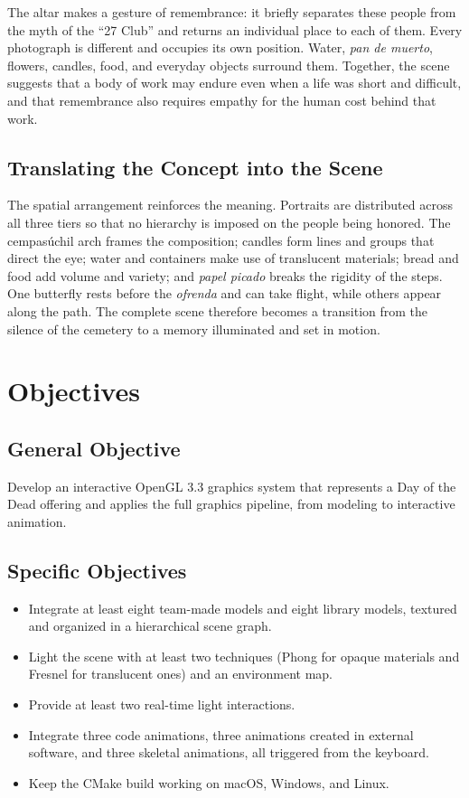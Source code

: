 \documentclass[letter,12pt]{article}
\begin{document}
	The altar makes a gesture of remembrance: it briefly separates these people from the myth of the ``27 Club'' and returns an individual place to each of them. Every photograph is different and occupies its own position. Water, \textit{pan de muerto}, flowers, candles, food, and everyday objects surround them. Together, the scene suggests that a body of work may endure even when a life was short and difficult, and that remembrance also requires empathy for the human cost behind that work.

	\subsection{Translating the Concept into the Scene}
	The spatial arrangement reinforces the meaning. Portraits are distributed across all three tiers so that no hierarchy is imposed on the people being honored. The cempasúchil arch frames the composition; candles form lines and groups that direct the eye; water and containers make use of translucent materials; bread and food add volume and variety; and \textit{papel picado} breaks the rigidity of the steps. One butterfly rests before the \textit{ofrenda} and can take flight, while others appear along the path. The complete scene therefore becomes a transition from the silence of the cemetery to a memory illuminated and set in motion.

	\section{Objectives}
	\subsection{General Objective}
	Develop an interactive OpenGL 3.3 graphics system that represents a Day of the Dead offering and applies the full graphics pipeline, from modeling to interactive animation.

	\subsection{Specific Objectives}
	\begin{itemize}[leftmargin=*]
		\item Integrate at least eight team-made models and eight library models, textured and organized in a hierarchical scene graph.
		\item Light the scene with at least two techniques (Phong for opaque materials and Fresnel for translucent ones) and an environment map.
		\item Provide at least two real-time light interactions.
		\item Integrate three code animations, three animations created in external software, and three skeletal animations, all triggered from the keyboard.
		\item Keep the CMake build working on macOS, Windows, and Linux.
	\end{itemize}
\end{document}
